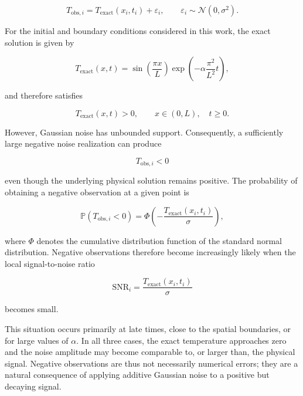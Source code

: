 \begin{equation}
T_{\mathrm{obs},i}
=
T_{\mathrm{exact}}(x_i,t_i)
+
\varepsilon_i,
\qquad
\varepsilon_i
\sim
\mathcal{N}(0,\sigma^2).
\end{equation}

For the initial and boundary conditions considered in this work, the exact solution is given by

\begin{equation}
T_{\mathrm{exact}}(x,t)
=
\sin\left(\frac{\pi x}{L}\right)
\exp\left(
-\alpha\frac{\pi^2}{L^2}t
\right),
\end{equation}

and therefore satisfies

\begin{equation}
T_{\mathrm{exact}}(x,t)>0,
\qquad
x\in(0,L), \quad t\geq 0.
\end{equation}

However, Gaussian noise has unbounded support. Consequently, a sufficiently large negative noise realization can produce

\begin{equation}
T_{\mathrm{obs},i}<0
\end{equation}

even though the underlying physical solution remains positive. The probability of obtaining a negative observation at a given point is

\begin{equation}
\mathbb{P}\left(T_{\mathrm{obs},i}<0\right)
=
\Phi\left(
-\frac{T_{\mathrm{exact}}(x_i,t_i)}{\sigma}
\right),
\end{equation}

where $\Phi$ denotes the cumulative distribution function of the standard normal distribution. Negative observations therefore become increasingly likely when the local signal-to-noise ratio

\begin{equation}
\mathrm{SNR}_i
=
\frac{T_{\mathrm{exact}}(x_i,t_i)}{\sigma}
\end{equation}

becomes small.

This situation occurs primarily at late times, close to the spatial boundaries, or for large values of $\alpha$. In all three cases, the exact temperature approaches zero and the noise amplitude may become comparable to, or larger than, the physical signal. Negative observations are thus not necessarily numerical errors; they are a natural consequence of applying additive Gaussian noise to a positive but decaying signal.

